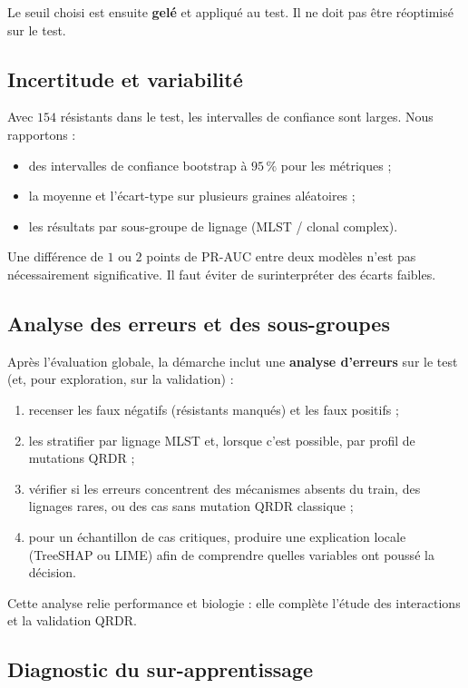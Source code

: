 \documentclass[11pt,a4paper]{article}
\begin{document}
Le seuil choisi est ensuite \textbf{gelé} et appliqué au test. Il ne doit pas être réoptimisé sur le test.

\subsection{Incertitude et variabilité}

Avec $154$ résistants dans le test, les intervalles de confiance sont larges. Nous rapportons :
\begin{itemize}[leftmargin=1.2em]
    \item des intervalles de confiance bootstrap à $95\,\%$ pour les métriques ;
    \item la moyenne et l'écart-type sur plusieurs graines aléatoires ;
    \item les résultats par sous-groupe de lignage (MLST / clonal complex).
\end{itemize}

Une différence de $1$ ou $2$ points de PR-AUC entre deux modèles n'est pas nécessairement significative. Il faut éviter de surinterpréter des écarts faibles.

\subsection{Analyse des erreurs et des sous-groupes}

Après l'évaluation globale, la démarche inclut une \textbf{analyse d'erreurs} sur le test (et, pour exploration, sur la validation) :
\begin{enumerate}[leftmargin=1.4em]
    \item recenser les faux négatifs (résistants manqués) et les faux positifs ;
    \item les stratifier par lignage MLST et, lorsque c'est possible, par profil de mutations QRDR ;
    \item vérifier si les erreurs concentrent des mécanismes absents du train, des lignages rares, ou des cas sans mutation QRDR classique ;
    \item pour un échantillon de cas critiques, produire une explication locale (TreeSHAP ou LIME) afin de comprendre quelles variables ont poussé la décision.
\end{enumerate}
Cette analyse relie performance et biologie : elle complète l'étude des interactions et la validation QRDR.

\subsection{Diagnostic du sur-apprentissage}
\end{document}
